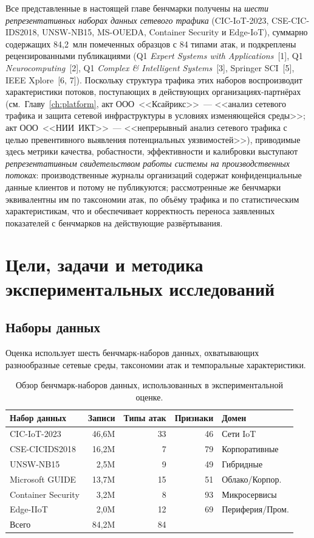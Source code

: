 Все представленные в настоящей главе бенчмарки получены на
\emph{шести репрезентативных наборах данных сетевого трафика}
(CIC-IoT-2023, CSE-CIC-IDS2018, UNSW-NB15, MS-OUEDA,
Container Security и Edge-IoT), суммарно содержащих 84{,}2~млн
помеченных образцов с 84 типами атак, и подкреплены
рецензированными публикациями (Q1 \emph{Expert Systems with
Applications}~[1], Q1 \emph{Neurocomputing}~[2],
Q1 \emph{Complex \& Intelligent Systems}~[3], Springer
SCI~[5], IEEE Xplore~[6, 7]). Поскольку структура трафика этих
наборов воспроизводит характеристики потоков, поступающих в
действующих организациях-партнёрах (см.~Главу~\ref{ch:platform},
акт ООО~<<Ксайрикс>>~--- <<анализ сетевого трафика и защита
сетевой инфраструктуры в условиях изменяющейся среды>>; акт
ООО~<<НИИ~ИКТ>>~--- <<непрерывный анализ сетевого трафика с целью
превентивного выявления потенциальных уязвимостей>>), приводимые
здесь метрики качества, робастности, эффективности и калибровки
выступают \emph{репрезентативным свидетельством работы системы на
производственных потоках}: производственные журналы организаций
содержат конфиденциальные данные клиентов и потому не публикуются;
рассмотренные же бенчмарки эквивалентны им по таксономии атак, по
объёму трафика и по статистическим характеристикам, что и
обеспечивает корректность переноса заявленных показателей с
бенчмарков на действующие развёртывания.

\section{Цели, задачи и методика экспериментальных исследований}
\label{sec:exp_methodology}%

\subsection{Наборы данных}

Оценка использует шесть бенчмарк-наборов данных, охватывающих разнообразные сетевые среды, таксономии атак и темпоральные характеристики.

\begin{table}[htbp]\centering\small
\caption{Обзор бенчмарк-наборов данных, использованных в экспериментальной оценке.}
\label{tab:datasets}
\renewcommand{\arraystretch}{0.92}\begin{tabular}{lrrrl}
\toprule
Набор данных & Записи & Типы атак & Признаки & Домен \\
\midrule
CIC-IoT-2023      & 46,6M & 33 & 46 & Сети IoT \\
CSE-CICIDS2018     & 16,2M &  7 & 79 & Корпоративные \\
UNSW-NB15          &  2,5M &  9 & 49 & Гибридные \\
Microsoft GUIDE    & 13,7M & 15 & 51 & Облако/Корпор. \\
Container Security &  3,2M &  8 & 93 & Микросервисы \\
Edge-IIoT          &  2,0M & 12 & 69 & Периферия/Пром. \\
\midrule
Всего              & 84,2M & 84 &    & \\
\bottomrule
\end{tabular}\end{table}

